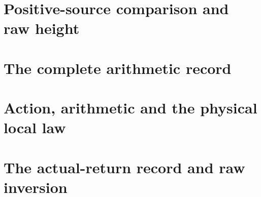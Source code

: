 \documentclass[11pt,reqno]{amsart}
\numberwithin{equation}{section}
\theoremstyle{definition}\newtheorem{definition}[theorem]{Definition}
\theoremstyle{remark}\newtheorem{remark}[theorem]{Remark}
\begin{document}
\part{Positive-source comparison and raw height}



\part{The complete arithmetic record}




























\part{Action, arithmetic and the physical local law}









\part{The actual-return record and raw inversion}
\end{document}
